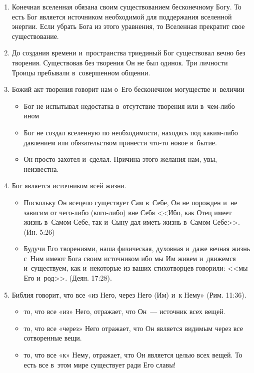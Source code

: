\documentclass[a4paper,12pt]{article}
\begin{document}
\begin{enumerate}    

    \item Конечная вселенная обязана своим существованием бесконечному Богу. То есть Бог является источником необходимой для поддержания вселенной энергии. Если убрать Бога из этого уравнения, то Вселенная прекратит свое существование.
    \item До создания времени и~пространства триединый Бог существовал вечно без творения. Существовав без творения Он не был одинок. Три личности Троицы пребывали в~совершенном общении.
    \item Божий акт творения говорит нам о~Его бесконечном могуществе и~величии
    \begin{itemize}
        \item Бог не испытывал недостатка в~отсутствие творения или в~чем-либо ином
        \item Бог не создал вселенную по необходимости, находясь под каким-либо давлением или обязательством принести что-то новое в~бытие.
        \item Он просто захотел и~сделал. Причина этого желания нам, увы, неизвестна.
    \end{itemize}

    \item Бог является источником всей жизни.
    
    \begin{itemize}
        \item Поскольку Он всецело существует Сам в~Себе, Он не порожден и~не зависим от чего-либо (кого-либо) вне Себя <<Ибо, как Отец имеет жизнь в~Самом Себе, так и~Сыну дал иметь жизнь в~Самом Себе>>. (Ин. 5:26)
        \item Будучи Его творениями, наша физическая, духовная и~даже вечная жизнь с~Ним имеют Бога своим источником ибо мы Им живем и~движемся и~существуем, как и~некоторые из ваших стихотворцев говорили: <<мы Его и~род>>. (Деян. 17:28).
    \end{itemize}

    \item Библия говорит, что все «из Него, через Него (Им) и~к Нему» (Рим. 11:36).
    
    \begin{itemize}
        \item то, что все «из» Него, отражает, что Он~--- источник всех вещей.
        \item то, что все «через» Него отражает, что Он является видимым через все сотворенные вещи.
        \item то, что все «к» Нему, отражает, что Он является целью всех вещей. То есть все в~этом мире существует ради Его славы!
    \end{itemize}
\end{enumerate}
\end{document}

